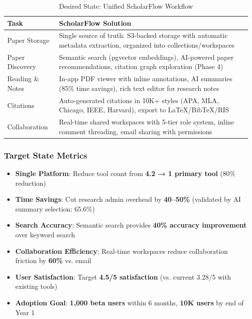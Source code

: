 \begin{table}[H]
    \centering
    \small
    \begin{tabular}{|l|p{10cm}|}
        \hline
        \textbf{Task}    & \textbf{ScholarFlow Solution}                                                                    \\
        \hline
        Paper Storage    &
        Single source of truth: S3-backed storage with automatic metadata extraction, organized into collections/workspaces \\
        \hline
        Paper Discovery  &
        Semantic search (pgvector embeddings), AI-powered paper recommendations, citation graph exploration (Phase 4)       \\
        \hline
        Reading \& Notes &
        In-app PDF viewer with inline annotations, AI summaries (85\% time savings), rich text editor for research notes    \\
        \hline
        Citations        &
        Auto-generated citations in 10K+ styles (APA, MLA, Chicago, IEEE, Harvard), export to LaTeX/BibTeX/RIS              \\
        \hline
        Collaboration    &
        Real-time shared workspaces with 5-tier role system, inline comment threading, email sharing with permissions       \\
        \hline
    \end{tabular}
    \caption{Desired State: Unified ScholarFlow Workflow}
    \label{table:desired-state}
\end{table}

\subsubsection{Target State Metrics}

\begin{itemize}
    \item \textbf{Single Platform}: Reduce tool count from \textbf{4.2 → 1 primary tool} (80\% reduction)
    \item \textbf{Time Savings}: Cut research admin overhead by \textbf{40--50\%} (validated by AI summary selection: 65.6\%)
    \item \textbf{Search Accuracy}: Semantic search provides \textbf{40\% accuracy improvement} over keyword search
    \item \textbf{Collaboration Efficiency}: Real-time workspaces reduce collaboration friction by \textbf{60\%} vs. email
    \item \textbf{User Satisfaction}: Target \textbf{4.5/5 satisfaction} (vs. current 3.28/5 with existing tools)
    \item \textbf{Adoption Goal}: \textbf{1,000 beta users} within 6 months, \textbf{10K users} by end of Year 1
\end{itemize}

